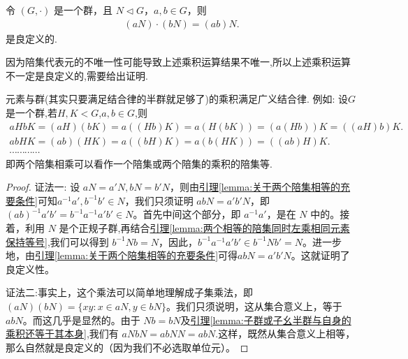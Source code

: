 \documentclass[../../main.tex]{subfiles}
\begin{document}
\begin{proposition}\label{proposition:陪集乘法的良定义性}
令 $(G,\cdot)$ 是一个群，且 $N\lhd G$，$a,b\in G$，则
\begin{align*}
(aN)\cdot(bN)=(ab)N.
\end{align*}
是良定义的.
\end{proposition}
\begin{remark}
因为陪集代表元的不唯一性可能导致上述乘积运算结果不唯一,所以上述乘积运算不一定是良定义的,需要给出证明.
\end{remark}
\begin{conclusion}
元素与群(其实只要满足结合律的半群就足够了)的乘积满足广义结合律. 例如:
设$G$是一个群,若$H,K<G$,$a,b\in G$,则
\begin{gather*}
aHbK=(aH)(bK)=a((Hb)K)=a(H(bK))=(a(Hb))K=((aH)b)K.
\\
abHK=(ab)(HK)=a((bH)K)=a(b(HK))=((ab)H)K.
\\
\cdots \cdots \cdots \cdots
\end{gather*}
即两个陪集相乘可以看作一个陪集或两个陪集的乘积的陪集等.
\end{conclusion}
\begin{proof}
{\color{blue}证法一:}
设 $aN = a'N, bN = b'N$，则由\hyperref[lemma:关于两个陪集相等的充要条件]{引理\ref{lemma:关于两个陪集相等的充要条件}}可知$a^{-1}a',b^{-1}b'\in N$，我们只须证明 $abN = a'b'N$，即 $(ab)^{-1}a'b' = b^{-1}a^{-1}a'b'\in N$。首先中间这个部分，即 $a^{-1}a'$，是在 $N$ 中的。接着，利用 $N$ 是个正规子群,再结合\hyperref[lemma:两个相等的陪集同时左乘相同元素保持等号]{引理\ref{lemma:两个相等的陪集同时左乘相同元素保持等号}},我们可以得到 $b^{-1}Nb = N$，因此，$b^{-1}a^{-1}a'b'\in b^{-1}Nb' = N$。进一步地，由\hyperref[lemma:关于两个陪集相等的充要条件]{引理\ref{lemma:关于两个陪集相等的充要条件}}可得$abN = a'b'N$。这就证明了良定义性。

{\color{blue}证法二:}事实上，这个乘法可以简单地理解成子集乘法，即 $(aN)(bN)=\{xy:x\in aN, y\in bN\}$。我们只须说明，这从集合意义上，等于 $abN$。而这几乎是显然的。由于 $Nb = bN$及\hyperref[lemma:子群或子幺半群与自身的乘积还等于其本身]{引理\ref{lemma:子群或子幺半群与自身的乘积还等于其本身}},我们有 $aNbN = abNN = abN$.这样，既然从集合意义上相等，那么自然就是良定义的（因为我们不必选取单位元）。 
\end{proof}
\end{document}
